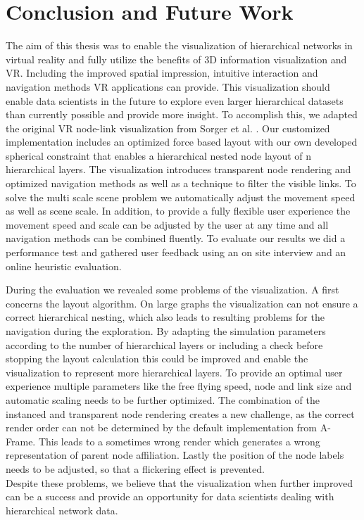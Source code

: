 \chapter{Conclusion and Future Work}
\label{chap:conclusion}

The aim of this thesis was to enable the visualization of hierarchical networks in virtual reality and fully utilize the benefits of 3D information visualization and VR. 
Including the improved spatial impression, intuitive interaction and navigation methods VR applications can provide. 
This visualization should enable data scientists in the future to explore even larger hierarchical datasets than currently possible and provide more insight.
To accomplish this, we adapted the original VR node-link visualization from Sorger et al. \cite{sorger_immersive_2019}. 
Our customized implementation includes an optimized force based layout with our own developed spherical constraint that enables a hierarchical nested node layout of n hierarchical layers.
The visualization introduces transparent node rendering and optimized navigation methods as well as a technique to filter the visible links. 
To solve the multi scale scene problem we automatically adjust the movement speed as well as scene scale.
In addition, to provide a fully flexible user experience the movement speed and scale can be adjusted by the user at any time and all navigation methods can be combined fluently.
To evaluate our results we did a performance test and gathered user feedback using an on site interview and an online heuristic evaluation.

During the evaluation we revealed some problems of the visualization. 
A first concerns the layout algorithm. On large graphs the visualization can not ensure a correct hierarchical nesting, which also leads to resulting problems for the navigation during the exploration. By adapting the simulation parameters according to the number of hierarchical layers or including a check before stopping the layout calculation this could be improved and enable the visualization to represent more hierarchical layers.
To provide an optimal user experience multiple parameters like the free flying speed, node and link size and automatic scaling needs to be further optimized.
The combination of the instanced and transparent node rendering creates a new challenge, as the correct render order can not be determined by the default implementation from A-Frame. This leads to a sometimes wrong render which generates a wrong representation of parent node affiliation.
Lastly the position of the node labels needs to be adjusted, so that a flickering effect is prevented.
\\
Despite these problems, we believe that the visualization when further improved can be a success and provide an opportunity for data scientists dealing with hierarchical network data.

